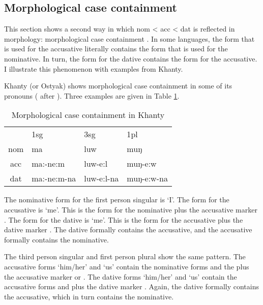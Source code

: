 \subsection{Morphological case containment}

This section shows a second way in which \ac{nom} < \ac{acc} < \ac{dat} is reflected in morphology: morphological case containment \citep[cf.][]{smith2019,zompi2017,caha2010}. In some languages, the form that is used for the accusative literally contains the form that is used for the nominative. In turn, the form for the dative contains the form for the accusative. I illustrate this phenomenon with examples from Khanty.

Khanty (or Ostyak) shows morphological case containment in some of its pronouns ( after \citealt{smith2019}). Three examples are given in Table \ref{tbl:cont-khanty}.

\begin{table}[H]
  \center
  \caption {Morphological case containment in Khanty}
  \begin{tabular}{clll}
  \toprule
            & \ac{1}\ac{sg}
            & \ac{3}\ac{sg}
            & \ac{1}\ac{pl}                           \\
            \cmidrule(lr){2-2} \cmidrule(lr){3-3} \cmidrule(lr){4-4}
  \ac{nom}  & ma
            & luw
            & muŋ                                     \\
  \ac{acc}  & ma:-ne:m
            & luw-e:l
            & muŋ-e:w                          \\
  \ac{dat}  & ma:-ne:m-na
            & luw-e:l-na
            & muŋ-e:w-na      \\
  \bottomrule
  \end{tabular}
  \label{tbl:cont-khanty}
\end{table}

The nominative form for the first person singular is  `I'. The form for the accusative is  `me'. This is the form for the nominative  plus the accusative marker . The form for the dative is  `me'. This is the form for the accusative  plus the dative marker . The dative formally contains the accusative, and the accusative formally contains the nominative.

The third person singular and first person plural show the same pattern. The accusative forms  `him/her' and  `us' contain the nominative forms  and the  plus the accusative marker  or . The dative forms  `him/her' and  `us' contain the accusative forms  and  plus the dative marker . Again, the dative formally contains the accusative, which in turn contains the nominative.


